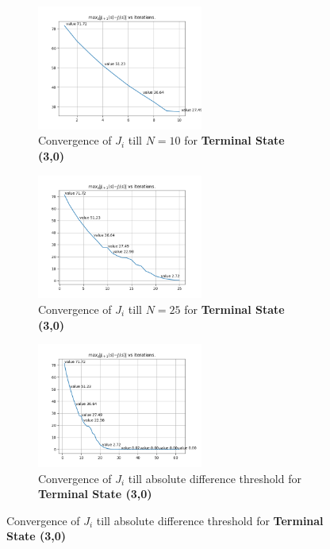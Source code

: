 \begin{figure}[h]
\begin{subfigure}
\centering
\includegraphics[angle=0,width=0.6\textwidth]{hw2/logs/t=3_N=10/convergence-till-10.png}
\caption{Convergence of $J_i$ till $N=10$ for \textbf{Terminal State (3,0)}}
\end{subfigure}

\begin{subfigure}
\centering
\includegraphics[angle=0,width=0.6\textwidth]{hw2/logs/t=3_N=25/convergence-till-25.png}
\caption{Convergence of $J_i$ till $N=25$ for \textbf{Terminal State (3,0)}}
\end{subfigure}

\begin{subfigure}
\centering
\includegraphics[angle=0,width=0.6\textwidth]{hw2/logs/t=3_N=-1/convergence-till-62.png}
\caption{Convergence of $J_i$ till absolute difference threshold for \textbf{Terminal State (3,0)}}
\end{subfigure}
\end{figure}


